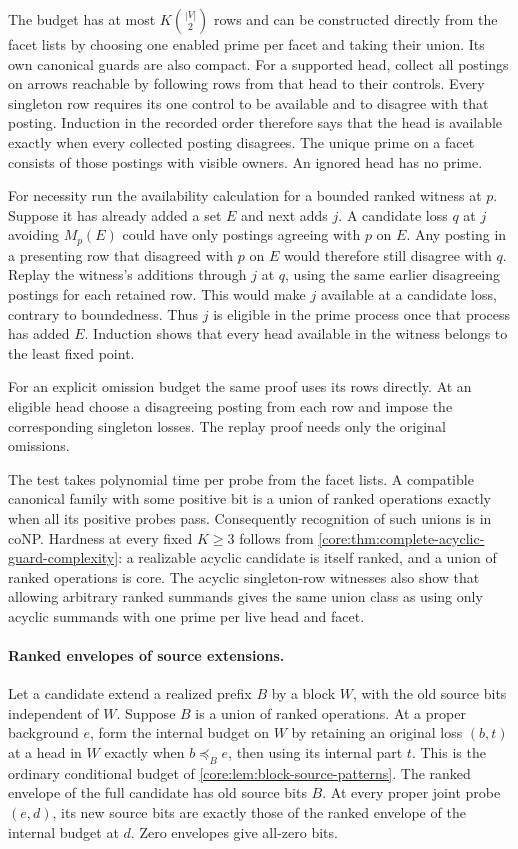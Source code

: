The budget has at most $K\binom{|V|}{2}$ rows and can be
constructed directly from the facet lists by choosing one
enabled prime per facet and taking their union. Its own
canonical guards are also compact. For a supported head,
collect all postings on arrows reachable by following rows
from that head to their controls. Every singleton row requires
its one control to be available and to disagree with that
posting. Induction in the recorded order therefore says that
the head is available exactly when every collected posting
disagrees. The unique prime on a facet consists of those
postings with visible owners. An ignored head has no prime.

For necessity run the availability calculation for a bounded
ranked witness at $p$. Suppose it has already added a set $E$
and next adds $j$. A candidate loss $q$ at $j$ avoiding $M_p(E)$
could have only postings agreeing with $p$ on $E$. Any posting
in a presenting row that disagreed with $p$ on $E$ would
therefore still disagree with $q$. Replay the witness's additions
through $j$ at $q$, using the same earlier disagreeing postings
for each retained row. This would make $j$ available at a
candidate loss, contrary to boundedness. Thus $j$ is eligible
in the prime process once that process has added $E$.
Induction shows that every head available in the witness
belongs to the least fixed point.

For an explicit omission budget the same proof uses its rows
directly. At an eligible head choose a disagreeing posting
from each row and impose the corresponding singleton losses.
The replay proof needs only the original omissions.

The test takes polynomial time per probe from the facet lists.
A compatible canonical family with some positive bit is a union
of ranked operations exactly when all its positive probes pass.
Consequently recognition of such unions is in coNP. Hardness
at every fixed $K\ge3$ follows from
\cref{core:thm:complete-acyclic-guard-complexity}: a realizable
acyclic candidate is itself ranked, and a union of ranked
operations is core. The
acyclic singleton-row witnesses also show that allowing
arbitrary ranked summands gives the same union class as using
only acyclic summands with one prime per live head and facet.

\paragraph{Ranked envelopes of source extensions.}
Let a candidate extend a realized prefix $B$ by a block $W$,
with the old source bits independent of $W$. Suppose $B$ is
a union of ranked operations. At a proper background $e$,
form the internal budget on $W$ by retaining an original
loss $(b,t)$ at a head in $W$ exactly when
$b\preceq_B e$, then using its internal part $t$.
This is the ordinary conditional budget of
\cref{core:lem:block-source-patterns}. The ranked envelope
of the full candidate has old source bits $B$. At every
proper joint probe $(e,d)$, its new source bits are exactly
those of the ranked envelope of the internal budget at $d$.
Zero envelopes give all-zero bits.

